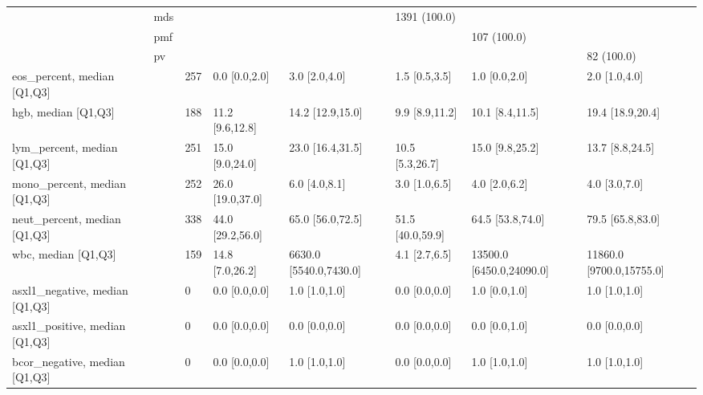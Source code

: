 \begin{tabular}{llllllll}
                               & mds &                      &                   &                         &      1391 (100.0) &                           &                           \\
                               & pmf &                      &                   &                         &                   &               107 (100.0) &                           \\
                               & pv &                      &                   &                         &                   &                           &                82 (100.0) \\
eos\_percent, median [Q1,Q3] &    &                  257 &     0.0 [0.0,2.0] &           3.0 [2.0,4.0] &     1.5 [0.5,3.5] &             1.0 [0.0,2.0] &             2.0 [1.0,4.0] \\
hgb, median [Q1,Q3] &    &                  188 &   11.2 [9.6,12.8] &        14.2 [12.9,15.0] &    9.9 [8.9,11.2] &           10.1 [8.4,11.5] &          19.4 [18.9,20.4] \\
lym\_percent, median [Q1,Q3] &    &                  251 &   15.0 [9.0,24.0] &        23.0 [16.4,31.5] &   10.5 [5.3,26.7] &           15.0 [9.8,25.2] &           13.7 [8.8,24.5] \\
mono\_percent, median [Q1,Q3] &    &                  252 &  26.0 [19.0,37.0] &           6.0 [4.0,8.1] &     3.0 [1.0,6.5] &             4.0 [2.0,6.2] &             4.0 [3.0,7.0] \\
neut\_percent, median [Q1,Q3] &    &                  338 &  44.0 [29.2,56.0] &        65.0 [56.0,72.5] &  51.5 [40.0,59.9] &          64.5 [53.8,74.0] &          79.5 [65.8,83.0] \\
wbc, median [Q1,Q3] &    &                  159 &   14.8 [7.0,26.2] &  6630.0 [5540.0,7430.0] &     4.1 [2.7,6.5] &  13500.0 [6450.0,24090.0] &  11860.0 [9700.0,15755.0] \\
asxl1\_negative, median [Q1,Q3] &    &                    0 &     0.0 [0.0,0.0] &           1.0 [1.0,1.0] &     0.0 [0.0,0.0] &             1.0 [0.0,1.0] &             1.0 [1.0,1.0] \\
asxl1\_positive, median [Q1,Q3] &    &                    0 &     0.0 [0.0,0.0] &           0.0 [0.0,0.0] &     0.0 [0.0,0.0] &             0.0 [0.0,1.0] &             0.0 [0.0,0.0] \\
bcor\_negative, median [Q1,Q3] &    &                    0 &     0.0 [0.0,0.0] &           1.0 [1.0,1.0] &     0.0 [0.0,0.0] &             1.0 [1.0,1.0] &             1.0 [1.0,1.0] \\

\end{tabular}
